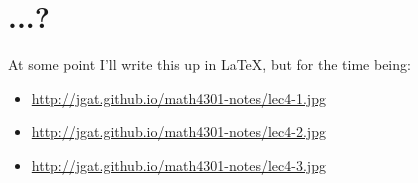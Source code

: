 \section{...?}

At some point I'll write this up in \LaTeX, but for the time being:

\begin{itemize}
\item \url{http://jgat.github.io/math4301-notes/lec4-1.jpg}
\item \url{http://jgat.github.io/math4301-notes/lec4-2.jpg}
\item \url{http://jgat.github.io/math4301-notes/lec4-3.jpg}
\end{itemize}

